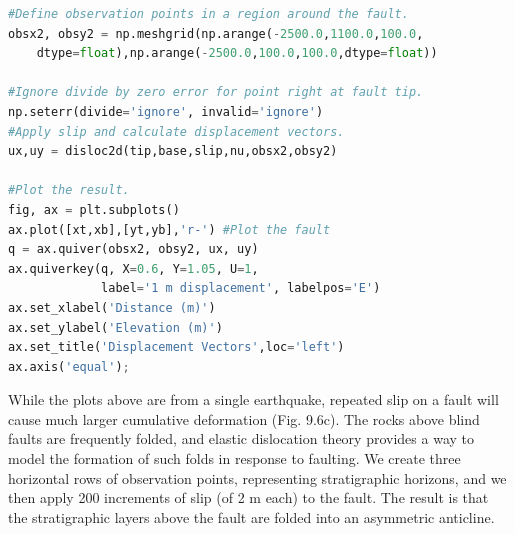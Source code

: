 \documentclass[a4paper , 12pt]{book}
\begin{document}
\begin{center}
\begin{lstlisting}[language=Python, frame=single]
#Define observation points in a region around the fault.
obsx2, obsy2 = np.meshgrid(np.arange(-2500.0,1100.0,100.0,
    dtype=float),np.arange(-2500.0,100.0,100.0,dtype=float))

#Ignore divide by zero error for point right at fault tip.
np.seterr(divide='ignore', invalid='ignore') 
#Apply slip and calculate displacement vectors.
ux,uy = disloc2d(tip,base,slip,nu,obsx2,obsy2)

#Plot the result.
fig, ax = plt.subplots()
ax.plot([xt,xb],[yt,yb],'r-') #Plot the fault
q = ax.quiver(obsx2, obsy2, ux, uy)
ax.quiverkey(q, X=0.6, Y=1.05, U=1, 
             label='1 m displacement', labelpos='E')
ax.set_xlabel('Distance (m)')
ax.set_ylabel('Elevation (m)')
ax.set_title('Displacement Vectors',loc='left')
ax.axis('equal');
\end{lstlisting}
\end{center}

While the plots above are from a single earthquake, repeated slip on a fault will cause much larger cumulative deformation (Fig. 9.6c). The rocks above blind faults are frequently folded, and elastic dislocation theory provides a way to model the formation of such folds in response to faulting. We create three horizontal rows of observation points, representing stratigraphic horizons, and we then apply 200 increments of slip (of 2 m each) to the fault. The result is that the stratigraphic layers above the fault are folded into an asymmetric anticline.
\end{document}
